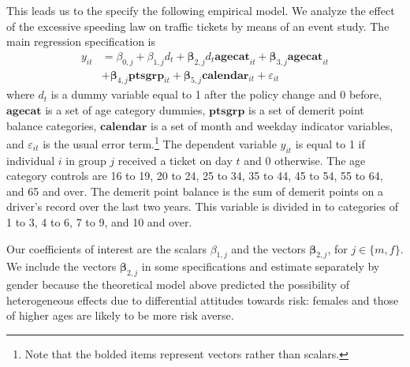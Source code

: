 This leads us to the specify the following empirical model.
% 
We analyze the effect of the excessive speeding law on traffic tickets 
by means of an event study. 
The main regression specification is
%
\begin{align*}
y_{it} & 	= \beta_{0,j} + \beta_{1,j} d_t
      		+ \bm{\beta}_{2,j} d_t \bm{agecat}_{it} 
	 		+ \bm{\beta}_{3,j} \mathbf{agecat}_{it} \\
         &	+ \bm{\beta}_{4,j} \bm{ptsgrp}_{it}
      		+ \bm{\beta}_{5,j} \bm{calendar}_{it}
      		+ \varepsilon_{it}
\end{align*}
%
where $d_t$ is a dummy variable equal to 
1 after the policy change and 0 before, 
$\mathbf{agecat}$ is a set of age category dummies, 
$\mathbf{ptsgrp}$ is a set of demerit point balance categories, 
$\mathbf{calendar}$ is a set of month and weekday indicator variables, 
and $\varepsilon_{it}$ is the usual error term.\footnote{%
Note that the bolded items represent vectors rather than scalars.}
%  
The dependent variable $y_{it}$ is equal to 1 if individual $i$ 
in group $j$ 
received a ticket on day $t$ and 0 otherwise. 
The age category controls are 
16 to 19, 20 to 24, 25 to 34, 35 to 44, 45 to 54, 55 to 64, and 65 and over. 
The demerit point balance is the sum of demerit points 
on a driver’s record over the last two years. 
This variable is divided in to categories of 1 to 3, 4 to 6, 7 to 9, and 10 and over.


Our coefficients of interest are 
the scalars $\beta_{1,j}$ and the vectors $\bm{\beta}_{2,j}$, 
for $j \in \{ m, f\}$. 
We include the vectors $\bm{\beta}_{2,j}$ in some specifications 
and estimate separately by gender because the theoretical model 
above predicted the possibility of heterogeneous effects 
due to differential attitudes towards risk: 
females and those of higher ages are likely to be more risk averse. 




